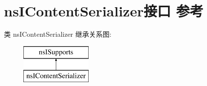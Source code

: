 \hypertarget{interfacens_i_content_serializer}{}\section{ns\+I\+Content\+Serializer接口 参考}
\label{interfacens_i_content_serializer}
类 ns\+I\+Content\+Serializer 继承关系图\+:\begin{figure}[H]
\begin{center}
\leavevmode
\includegraphics[height=2.000000cm]{interfacens_i_content_serializer}
\end{center}
\end{figure}
